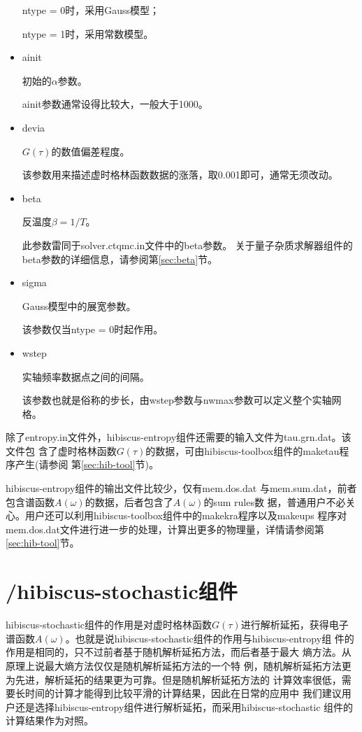 \begin{itemize}
ntype = 0时，采用Gauss模型；

ntype = 1时，采用常数模型。

\item {\color{red}ainit}

初始的$\alpha$参数。

ainit参数通常设得比较大，一般大于1000。

\item {\color{red}devia}

$G(\tau)$的数值偏差程度。

该参数用来描述虚时格林函数数据的涨落，取0.001即可，通常无须改动。

\item {\color{red}beta}

反温度$\beta = 1/T$。

此参数雷同于solver.ctqmc.in文件中的beta参数。
关于量子杂质求解器组件的beta参数的详细信息，请参阅第\ref{sec:beta}节。

\item {\color{red}sigma}

Gauss模型中的展宽参数。

该参数仅当ntype = 0时起作用。

\item {\color{red}wstep}

实轴频率数据点之间的间隔。

该参数也就是俗称的步长，由wstep参数与nwmax参数可以定义整个实轴网格。

\end{itemize}

除了entropy.in文件外，hibiscus-entropy组件还需要的输入文件为tau.grn.dat。该文件包
含了虚时格林函数$G(\tau)$的数据，可由hibiscus-toolbox组件的maketau程序产生(请参阅
第\ref{sec:hib-tool}节)。

hibiscus-entropy组件的输出文件比较少，仅有mem.dos.dat
与mem.sum.dat，前者包含谱函数$A(\omega)$的数据，后者包含了$A(\omega)$的sum rules数
据，普通用户不必关心。用户还可以利用hibiscus-toolbox组件中的makekra程序以及makeups
程序对mem.dos.dat文件进行进一步的处理，计算出更多的物理量，详情请参阅第\ref{sec:hib-tool}节。

\section{{\hibiscus}/hibiscus-stochastic组件}
\label{sec:hib-sai}

hibiscus-stochastic组件的作用是对虚时格林函数$G(\tau)$进行解析延拓，获得电子
谱函数$A(\omega)$。也就是说hibiscus-stochastic组件的作用与hibiscus-entropy组
件的作用是相同的，只不过前者基于随机解析延拓方法\cite{beach}，而后者基于最大
熵方法\cite{jarrell:133}。从原理上说最大熵方法仅仅是随机解析延拓方法的一个特
例，随机解析延拓方法更为先进，解析延拓的结果更为可靠。但是随机解析延拓方法的
计算效率很低，需要长时间的计算才能得到比较平滑的计算结果，因此在日常的应用中
我们建议用户还是选择hibiscus-entropy组件进行解析延拓，而采用hibiscus-stochastic
组件的计算结果作为对照。

